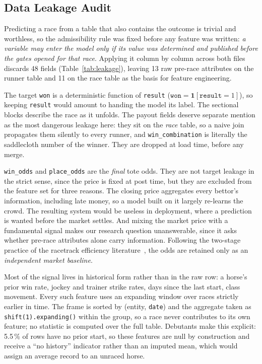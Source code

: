 \subsection{Data Leakage Audit}
\label{sec:leakage}

Predicting a race from a table that also contains the outcome is trivial
and worthless, so the admissibility rule was fixed before any feature was
written: \emph{a variable may enter the model only if its value was
determined and published before the gates opened for that race}. Applying
it column by column across both files discards 48 fields
(Table~\ref{tab:leakage}), leaving 13 raw pre-race attributes on the
runner table and 11 on the race table as the basis for feature
engineering.

The target \texttt{won} is a deterministic function of \texttt{result}
($\texttt{won}=\mathbf{1}[\texttt{result}=1]$), so keeping \texttt{result}
would amount to handing the model its label. The sectional blocks describe
the race as it unfolds. The payout fields deserve separate mention as the
most dangerous leakage here: they sit on the \emph{race} table, so a naive
join propagates them silently to every runner, and
\texttt{win\_combination} is literally the saddlecloth number of the
winner. They are dropped at load time, before any merge.

\texttt{win\_odds} and \texttt{place\_odds} are the \emph{final} tote
odds. They are not target leakage in the strict sense, since the price is
fixed at post time, but they are excluded from the feature set for three
reasons. The closing price aggregates every bettor's information,
including late money, so a model built on it largely re-learns the crowd.
The resulting system would be useless in deployment, where a prediction is
wanted before the market settles. And mixing the market price with a
fundamental signal makes our research question unanswerable, since it asks
whether pre-race attributes alone carry information. Following the
two-stage practice of the racetrack efficiency
literature~\cite{ejeA_benter2008}, the odds are retained only as an
\emph{independent market baseline}.

Most of the signal lives in historical form rather than in the raw row: a
horse's prior win rate, jockey and trainer strike rates, days since the
last start, class movement. Every such feature uses an expanding window
over races strictly earlier in time. The frame is sorted by (entity,
\texttt{date}) and the aggregate taken as \texttt{shift(1).expanding()}
within the group, so a race never contributes to its own feature; no
statistic is computed over the full table. Debutants make this explicit:
5.5\,\% of rows have no prior start, so these features are null by
construction and receive a ``no history'' indicator rather than an imputed
mean, which would assign an average record to an unraced horse.

